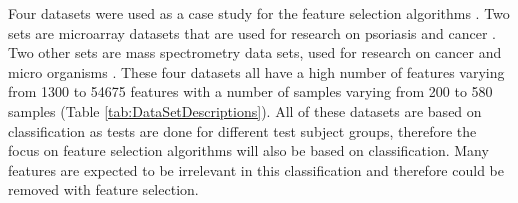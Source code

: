 \documentclass[10pt,a4paper]{report}
\begin{document}
	Four datasets were used as a case study for the feature selection algorithms . Two sets are microarray datasets that are used for research on psoriasis \cite{nair2009genome, suarez2012expanding, bigler2013cross, yao2008type} and cancer \cite{wojnarski2010rsctc}. Two other sets are mass spectrometry data sets, used for research on cancer \cite{NIPS2004_2728} and micro organisms \cite{doi:10.1093/bioinformatics/btu022}. These four datasets all have a high number of features varying from 1300 to 54675 features with a number of samples varying from 200 to 580 samples (Table \ref{tab:DataSetDescriptions}). All of these datasets are based on classification as tests are done for different test subject groups, therefore the focus on feature selection algorithms will also be based on classification. Many features are expected to be irrelevant in this classification and therefore could be removed with feature selection.	
\end{document}
